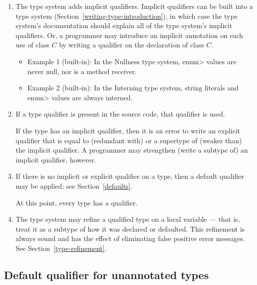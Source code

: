 \begin{enumerate}
\item
  The type system adds implicit qualifiers.  Implicit qualifiers can be
  built into a type system (Section~\ref{writing-type-introduction}), in
  which case the type system's documentation should explain all of the type
  system's implicit qualifiers.  Or, a programmer may introduce an implicit
  annotation on each use of class $C$ by writing a qualifier on the
  declaration of class $C$.

\begin{itemize}
\item
  Example 1 (built-in):  In the Nullness type system,
  \<enum> values are never null, nor is a method receiver.
\item
  Example 2 (built-in):  In the Interning type system, string literals
  and \<enum> values are always interned.
\end{itemize}

\item
  If a type qualifier is present in the source code, that qualifier is used.

  If the type has an implicit qualifier, then it is an error to write an
  explicit qualifier that is equal to (redundant with) or a supertype of
  (weaker than) the implicit qualifier.  A programmer may strengthen
  (write a subtype of) an implicit qualifier, however.

\item
  If there is no implicit or explicit qualifier on a type, then a default
  qualifier may be applied; see Section~\ref{defaults}.

  \smallskip

  At this point, every type has a qualifier.

\item
  The type system may refine a qualified type on a local variable --- that
  is, treat it as a subtype of how it was declared or defaulted.  This
  refinement is always sound and has the effect of eliminating false
  positive error messages.  See Section~\ref{type-refinement}.


\end{enumerate}



\subsection{Default qualifier for unannotated types\label{defaults}}

